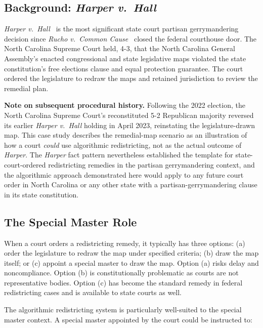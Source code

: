\label{sec:north-carolina}

\subsection{Background: \textit{Harper v.\ Hall}}

\textit{Harper v.\ Hall}~\citep{harper2022} is the most significant state
court partisan gerrymandering decision since \textit{Rucho v.\ Common
Cause}~\citep{rucho2019} closed the federal courthouse door.  The North
Carolina Supreme Court held, 4-3, that the North Carolina General Assembly's
enacted congressional and state legislative maps violated the state
constitution's free elections clause and equal protection guarantee.  The
court ordered the legislature to redraw the maps and retained jurisdiction to
review the remedial plan.

\textbf{Note on subsequent procedural history.}
Following the 2022 election, the North Carolina Supreme Court's reconstituted
5-2 Republican majority reversed its earlier \textit{Harper v.\ Hall} holding
in April 2023, reinstating the legislature-drawn map.
This case study describes the remedial-map scenario as an illustration of
how a court \emph{could} use algorithmic redistricting, not as the actual
outcome of \textit{Harper}.
The \textit{Harper} fact pattern nevertheless established the template for
state-court-ordered redistricting remedies in the partisan gerrymandering
context, and the algorithmic approach demonstrated here would apply to any
future court order in North Carolina or any other state with a
partisan-gerrymandering clause in its state constitution.

\subsection{The Special Master Role}

When a court orders a redistricting remedy, it typically has three options:
(a) order the legislature to redraw the map under specified criteria;
(b) draw the map itself; or (c) appoint a special master to draw the map.
Option (a) risks delay and noncompliance.  Option (b) is constitutionally
problematic as courts are not representative bodies.  Option (c) has
become the standard remedy in federal redistricting cases and is available
to state courts as well.

The algorithmic redistricting system is particularly well-suited to the
special master context.  A special master appointed by the court could be
instructed to:

